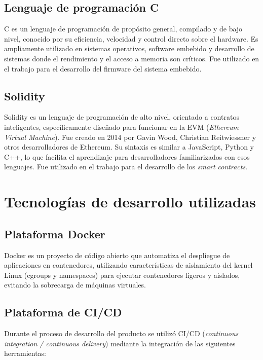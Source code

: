 \subsection{Lenguaje de programación C}
C es un lenguaje de programación de propósito general, compilado y de bajo nivel, conocido por su eficiencia, velocidad y control directo sobre el hardware. Es ampliamente utilizado en sistemas operativos, software embebido y desarrollo de sistemas donde el rendimiento y el acceso a memoria son críticos. Fue utilizado en el trabajo para el desarrollo del firmware del sistema embebido.

\subsection{Solidity}

Solidity \cite{solidity} es un lenguaje de programación de alto nivel, orientado a contratos inteligentes, específicamente diseñado para funcionar en la EVM (\textit{Ethereum Virtual Machine}). Fue creado en 2014 por Gavin Wood, Christian Reitwiessner y otros desarrolladores de Ethereum. Su sintaxis es similar a JavaScript, Python y C++, lo que facilita el aprendizaje para desarrolladores familiarizados con esos lenguajes. Fue utilizado en el trabajo para el desarrollo de los \textit{smart contracts}.


\section{Tecnologías de desarrollo utilizadas}


\subsection{Plataforma Docker}

Docker \cite{docker_website} es un proyecto de código abierto que automatiza el despliegue de aplicaciones en contenedores, utilizando características de aislamiento del kernel Linux (cgroups y namespaces) para ejecutar contenedores ligeros y aislados, evitando la sobrecarga de máquinas virtuales.





\subsection{Plataforma de CI/CD}
Durante el proceso de desarrollo del producto se utilizó CI/CD (\textit{continuous integration / continuous delivery}) mediante la integración de las siguientes herramientas:

